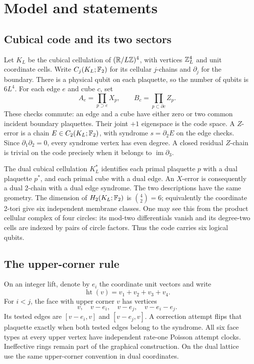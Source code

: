 \section{Model and statements}\label{sec:model}

\subsection{Cubical code and its two sectors}

Let \(K_L\) be the cubical cellulation of
\((\mathbb R/L\mathbb Z)^4\), with vertices \(\mathbb Z_L^4\) and unit coordinate
cells. Write \(C_j(K_L;\mathbb F_2)\) for its cellular \(j\)-chains and
\(\partial_j\) for the boundary. There is a physical qubit on each
plaquette, so the number of qubits is \(6L^4\). For each edge \(e\) and
cube \(c\), set
\begin{equation}
 A_e=\prod_{p\supset e}X_p,\qquad
 B_c=\prod_{p\subset\partial c}Z_p.
\end{equation}
These checks commute: an edge and a cube have either zero or two common
incident boundary plaquettes. Their joint \(+1\) eigenspace is the code
space. A \(Z\)-error is a chain \(E\in C_2(K_L;\mathbb F_2)\), with syndrome
\(s=\partial_2E\) on the edge checks. Since
\(\partial_1\partial_2=0\), every syndrome vertex has even degree.
A closed residual \(Z\)-chain is trivial on the code precisely when
it belongs to \(\operatorname{im}\partial_3\).

The dual cubical cellulation \(K_L^*\) identifies each primal
plaquette \(p\) with a dual plaquette \(p^*\), and each primal cube with
a dual edge. An \(X\)-error is consequently a dual 2-chain with a dual
edge syndrome. The two descriptions have the same geometry. The
dimension of \(H_2(K_L;\mathbb F_2)\) is \(\binom42=6\); equivalently the
coordinate 2-tori give six independent membrane classes. One may see
this from the product cellular complex of four circles: its mod-two
differentials vanish and its degree-two cells are indexed by pairs of
circle factors. Thus the code carries six logical qubits.

\subsection{The upper-corner rule}

On an integer lift, denote by \(e_i\) the coordinate unit vectors and
write
\[
 \operatorname{ht}(v)=v_1+v_2+v_3+v_4.
\]
For \(i<j\), the face with upper corner \(v\) has vertices
\[
 v,\quad v-e_i,\quad v-e_j,\quad v-e_i-e_j.
\]
Its tested edges are \([v-e_i,v]\) and \([v-e_j,v]\). A correction
attempt flips that plaquette exactly when both tested edges belong to
the syndrome. All six face types at every upper vertex have independent
rate-one Poisson attempt clocks. Ineffective rings remain part of the
graphical construction. On the dual lattice use the same upper-corner
convention in dual coordinates.

